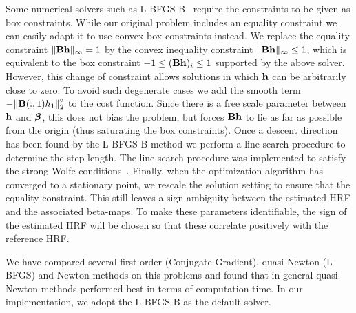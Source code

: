 Some numerical solvers such as L-BFGS-B~\citep{liu1989limited}
require the constraints to be given as box constraints. While our original
problem includes an equality constraint we can easily
adapt it to use convex box constraints instead.
We replace the equality constraint $\|\mathbf{B h}\|_{\infty} = 1$ by
the convex inequality constraint $\|\mathbf{B h}\|_{\infty} \leq 1$, which is equivalent
to the box constraint $-1 \leq (\mathbf{B h})_i \leq 1$ supported by the above solver. 
However, this change of constraint
allows solutions in which $\mathbf{h}$ can be arbitrarily close to zero. To avoid such
degenerate cases we add the smooth term $-\|\mathbf{B}(:, 1) h_1\|^2 _2$ to the cost function. Since
there is a free scale parameter between $\mathbf{h}$
and ${\boldsymbol \beta}$, this does not bias the problem, but forces $\mathbf{B h}$ to lie as far as possible from the origin (thus saturating the box constraints). Once a descent
direction has been found by the \mbox{L-BFGS-B} method we perform a line search
procedure to determine the step length. The line-search
procedure was implemented to satisfy the strong Wolfe conditions~\citep{nocedal2006numerical}.
Finally, when the optimization algorithm has converged to a stationary point, 
we rescale the solution setting to ensure that the equality constraint. This still leaves a sign ambiguity between the estimated HRF and the associated beta-maps. To make these parameters identifiable, the sign of the estimated HRF will be chosen so that these correlate positively with the reference HRF.

We have compared several first-order (Conjugate Gradient), \mbox{quasi-Newton}
(L-BFGS) and Newton methods on this problems and found that in general \mbox{quasi-Newton} methods performed best in terms of computation time. In our
implementation, we adopt the L-BFGS-B as the default solver. 

